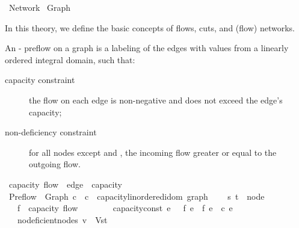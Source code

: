 %
\begin{isabellebody}%
%
%
\isamarkuptrue%
%
\isadelimtheory
%
\endisadelimtheory
%
\isatagtheory
{}\isamarkupfalse%
\ Network\isanewline
{}\ Graph\isanewline
{}%
\endisatagtheory
{\isafoldtheory}%
%
\isadelimtheory
%
\endisadelimtheory
%
\begin{isamarkuptext}%
In this theory, we define the basic concepts of flows, cuts, 
  and (flow) networks.%
\end{isamarkuptext}\isamarkuptrue%
%
\isamarkuptrue%
%
\isamarkuptrue%
%
\begin{isamarkuptext}%
An - preflow on a graph is a labeling of the edges with 
  values from a linearly ordered integral domain, such that: 
  \begin{description}
    \item[capacity constraint] the flow on each edge is non-negative and 
      does not exceed the edge's capacity;
    \item[non-deficiency constraint] for all nodes except  and , 
      the incoming flow greater or equal to the outgoing flow.
  \end{description}%
\end{isamarkuptext}\isamarkuptrue%
\isamarkupfalse%
\ {\isacharprime}capacity\ flow\ {\isacharequal}\ {\isachardoublequoteopen}edge\ {\isasymRightarrow}\ {\isacharprime}capacity{\isachardoublequoteclose}\isanewline
\isanewline
{}\isamarkupfalse%
\ Preflow\ {\isacharequal}\ Graph\ c\ \ c\ {\isacharcolon}{\isacharcolon}\ {\isachardoublequoteopen}{\isacharprime}capacity{\isacharcolon}{\isacharcolon}linordered{\isacharunderscore}idom\ graph{\isachardoublequoteclose}\ {\isacharplus}\isanewline
\ \ \ s\ t\ {\isacharcolon}{\isacharcolon}\ node\isanewline
\ \ \ f\ {\isacharcolon}{\isacharcolon}\ {\isachardoublequoteopen}{\isacharprime}capacity\ flow{\isachardoublequoteclose}\ \ \isanewline
\ \ \isanewline
\ \ \ capacity{\isacharunderscore}const{\isacharcolon}\ {\isachardoublequoteopen}{\isasymforall}e{\isachardot}\ {}\ {\isasymle}\ f\ e\ {\isasymand}\ f\ e\ {\isasymle}\ c\ e{\isachardoublequoteclose}\isanewline
\ \ \ no{\isacharunderscore}deficient{\isacharunderscore}nodes{\isacharcolon}\ {\isachardoublequoteopen}{\isasymforall}v\ {\isasymin}\ V{\isacharminus}{\isacharbraceleft}s{\isacharcomma}t{\isacharbraceright}{\isachardot}\isanewline

\end{isabellebody}
